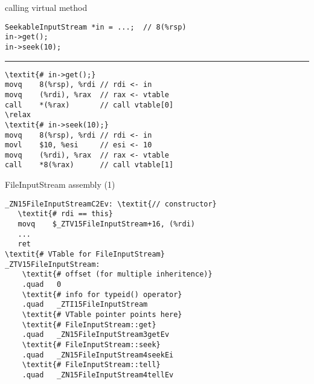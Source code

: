\begin{frame}[fragile]{calling virtual method}
\begin{Verbatim}[fontsize=\fontsize{9}{10},commandchars=\\\{\}]
SeekableInputStream *in = ...;  // 8(%rsp)
in->get();
in->seek(10);
\end{Verbatim}
\hrule
\begin{Verbatim}[fontsize=\fontsize{9}{10},commandchars=\\\{\}]
\textit{# in->get();}
movq    8(%rsp), %rdi // rdi <- in
movq    (%rdi), %rax  // rax <- vtable
call    *(%rax)       // call vtable[0]
\relax
\textit{# in->seek(10);}
movq    8(%rsp), %rdi // rdi <- in
movl    $10, %esi     // esi <- 10
movq    (%rdi), %rax  // rax <- vtable
call    *8(%rax)      // call vtable[1]
\end{Verbatim}
\end{frame}



\begin{frame}[fragile]{FileInputStream assembly (1)}
\begin{Verbatim}[fontsize=\fontsize{9}{10},commandchars=\\\{\}]
_ZN15FileInputStreamC2Ev: \textit{// constructor}
   \textit{# rdi == this}
   movq    $_ZTV15FileInputStream+16, (%rdi)
   ...
   ret
\textit{# VTable for FileInputStream}
_ZTV15FileInputStream:
    \textit{# offset (for multiple inheritence)}
    .quad   0 
    \textit{# info for typeid() operator}
    .quad   _ZTI15FileInputStream
    \textit{# VTable pointer points here}
    \textit{# FileInputStream::get}
    .quad   _ZN15FileInputStream3getEv
    \textit{# FileInputStream::seek}
    .quad   _ZN15FileInputStream4seekEi
    \textit{# FileInputStream::tell}
    .quad   _ZN15FileInputStream4tellEv
\end{Verbatim}
\end{frame}


